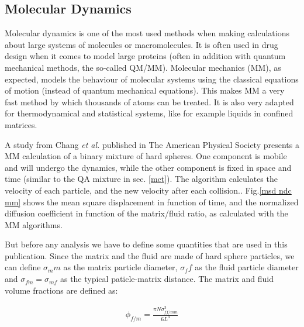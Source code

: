 \documentclass[a4paper,12pt]{article}
\newcommand{\jline}{\vspace{10pt}}
\newcommand{\etal}{\textit{et al.}}
\begin{document}
\subsection{Molecular Dynamics}

Molecular dynamics is one of the most used methods when making calculations about large systems of molecules or macromolecules. It is often used in drug design when it comes to model large proteins (often in addition with quantum mechanical methods, the so-called QM/MM). Molecular mechanics (MM), as expected, models the behaviour of molecular systems using the classical equations of motion (instead of quantum mechanical equations). This makes MM a very fast method by which thousands of atoms can be treated. It is also very adapted for thermodynamical and statistical systems, like for example liquids in confined matrices.\jline

A study from Chang \etal \cite{Chang2004} published in The American Physical Society presents a MM calculation of a binary mixture of hard spheres. One component is mobile and will undergo the dynamics, while the other component is fixed in space and time (similar to the QA mixture in sec. \ref{mct}). The algorithm calculates the velocity of each particle, and the new velocity after each collision.. Fig.\ref{msd ndc mm} shows the mean square displacement in function of time, and the normalized diffusion coefficient in function of the matrix/fluid ratio, as calculated with the MM algorithms.\jline

But before any analysis we have to define some quantities that are used in this publication. Since the matrix and the fluid are made of hard sphere particles, we can define $\sigma_mm$ as the matrix particle diameter, $\sigma_ff$ as the fluid particle diameter and $\sigma_{fm} = \sigma_{mf}$ as the typical paticle-matrix distance. The matrix and fluid volume fractions are defined as:

\begin{align}
\phi_{f/m} = \frac{\pi N \sigma_{ff/mm}^3}{6L^3}
\end{align}
\end{document}
